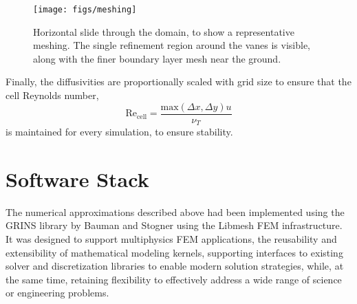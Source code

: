   \begin{figure}[!htb]
    \begin{center}
     \texttt{[image: figs/meshing]}
     \caption{Horizontal slide through the domain, to show a
     representative meshing. The single refinement region around the
     vanes is visible, along with the finer boundary layer mesh near the
     ground.}
     \label{fig:meshing}
    \end{center}
  \end{figure}

Finally, the diffusivities are proportionally
scaled with grid size to ensure that the cell Reynolds number, 
\begin{equation}
 \text{Re}_\text{cell} = \frac{\text{max}(\Delta x,\Delta y) u}{\nu_T}
\end{equation}
 is maintained for every simulation, to ensure stability.




\section{Software Stack}

The numerical approximations described above had been implemented using
the GRINS library\cite{GRINSpaper} by Bauman and Stogner using the
Libmesh\cite{libMeshPaper} FEM infrastructure. It was designed to
support multiphysics FEM applications, the reusability and extensibility
of mathematical modeling kernels, supporting interfaces to existing
solver and discretization libraries to enable modern solution
strategies, while, at the same time, retaining flexibility to
effectively address a wide range of science or engineering problems.  


